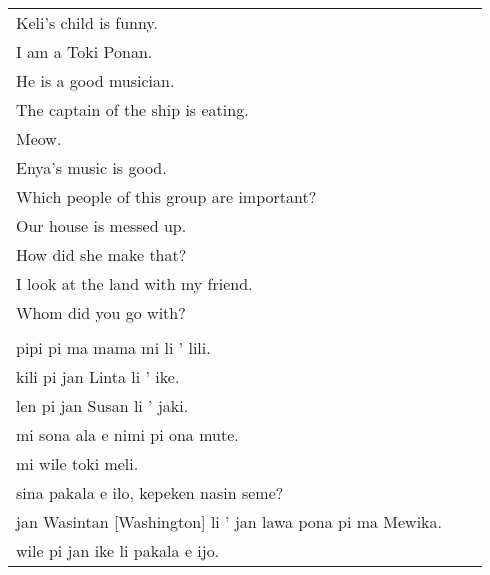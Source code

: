 \begin{supertabular}{p{5,5cm}|ll}
Keli's child is funny.    \\ %
I am a Toki Ponan.   \\  %
He is a good musician.   \\  %
The captain of the ship is eating.    \\ %
Meow.    \\ %
Enya's music is good.    \\ %
Which people of this group are important?    \\ %
Our house is messed up.    \\ %
How did she make that?    \\ %
I look at the land with my friend. && \\ %
Whom did you go with? &&  \\  %
 && \\ %
pipi pi ma mama mi li ' lili.  \\ %
kili pi jan Linta li ' ike.    \\ %
len pi jan Susan li ' jaki.    \\ %
mi sona ala e nimi pi ona mute.    \\ %
mi wile toki meli.    \\ %
sina pakala e ilo, kepeken nasin seme?    \\ %
jan Wasintan [Washington] li ' jan lawa pona pi ma Mewika.  \\   %
wile pi jan ike li pakala e ijo.    \\ %
\end{supertabular}  
